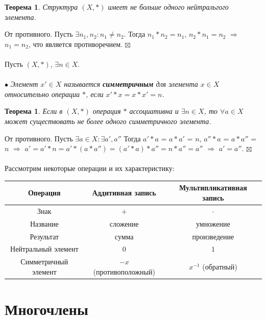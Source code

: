 \documentclass[a4paper, 12pt]{report}
\newenvironment{Proof} %
{\par\noindent{$\blacklozenge$}} %
{\hfill$\scriptstyle\boxtimes$}
\begin{document}
	\newtheorem*{t6_3}{Теорема}\begin{t6_3}Структура $(X, *)$ имеет не больше одного нейтральгого элемента. \end{t6_3} 
	\begin{Proof} От противного. Пусть $\exists n_1, n_2 : n_1\not= n_2$. Тогда $n_1 * n_2 = n_1$, $n_2 * n_1 = n_2$ $\Rightarrow$ $n_1 = n_2$, что является противоречием. \end{Proof} \\\\
	Пусть $(X, *)$, $\exists n \in X$.\\\\
	$\bullet$ \textit{Элемент $x'\in X$ называется \textbf{симметричным} для элемента $x\in X$ относительно операции $*$, если $x' * x = x * x' = n$.}
	\newtheorem*{t6_3_2}{Теорема}\begin{t6_3_2} Если в $(X, *)$ операция $*$ ассоциативна и $\exists n \in X$, то $\forall a\in X$ может существовать не более одного симметричного элемента.  \end{t6_3_2} 
	\begin{Proof}
		От противного. Пусть $\exists a \in X :  \exists a', a''$ Тогда $a' * a$ = $a * a'$ = $n$, $a'' * a$ = $a * a''$ = $n$ $\Rightarrow$ $a' = a' * n = a' * (a * a'') = (a' * a) * a'' = n * a'' = a''$ $\Rightarrow$ $a' = a''$. \end{Proof} \\\\
	Рассмотрим некоторые операции и их характеристику:\begin{center}
		\begin{tabular}{|c|c|c|}
			\hline
			Операция & Аддитивная запись & Мультипликативная запись  \\
			\hline
			Знак & $+$ & $\cdot$ \\
			Название & сложение & умножение \\
			Результат & сумма & произведение \\
			Нейтральный элемент & $0$ & $1$ \\
			Симметричный элемент & $-x$ (противоположный) & $x^{-1}$ (обратный) \\
			\hline
		\end{tabular}
	\end{center}
	
	
	
	\chapter{Многочлены}
\end{document}
